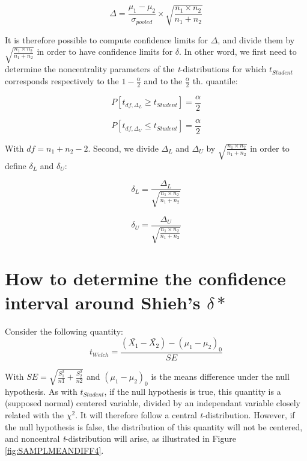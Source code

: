 \documentclass[
  man,floatsintext]{apa6}
\begin{document}
\begin{equation}
\Delta = \frac{\mu_1-\mu_2}{\sigma_{pooled}} \times \sqrt{\frac{n_1 \times n_2}{n_1 + n_2}}
\label{eq:ncp}
\end{equation}

It is therefore possible to compute confidence limits for \(\Delta\), and divide them by \(\sqrt{\frac{n_1 \times n_2}{n_1 + n_2}}\) in order to have confidence limits for \(\delta\). In other word, we first need to determine the noncentrality parameters of the \emph{t}-distributions for which \(t_{Student}\) corresponds respectively to the \(1-\frac{\alpha}{2}\) and to the \(\frac{\alpha}{2}\) th. quantile:

\[P[t_{df, \Delta_L} \geq t_{Student}] = \frac{\alpha}{2} \]

\[P[t_{df, \Delta_U} \leq t_{Student}] = \frac{\alpha}{2} \]

With \(df = n_1+n_2-2\). Second, we divide \(\Delta_L\) and \(\Delta_U\) by \(\sqrt{\frac{n_1 \times n_2}{n_1 + n_2}}\) in order to define \(\delta_L\) and \(\delta_U\):

\[\delta_L = \frac{\Delta_L}{\sqrt{\frac{n_1 \times n_2}{n_1 + n_2}}}\]

\[\delta_U = \frac{\Delta_U}{\sqrt{\frac{n_1 \times n_2}{n_1 + n_2}}}\]

\hypertarget{how-to-determine-the-confidence-interval-around-shiehs-delta}{%
\section{\texorpdfstring{How to determine the confidence interval around Shieh's \(\delta*\)}{How to determine the confidence interval around Shieh's \textbackslash delta*}}\label{how-to-determine-the-confidence-interval-around-shiehs-delta}}

Consider the following quantity:
\begin{equation} 
t_{Welch}=\frac{(\bar{X_1}-\bar{X_2})-(\mu_1-\mu_2)_0}{SE}
\label{eq:plausiblelimit2}
\end{equation}

With \(SE = \sqrt{\frac{S^2_1}{n1}+\frac{S^2_2}{n2}}\) and \((\mu_1-\mu_2)_0\) is the means difference under the null hypothesis. As with \(t_{Student}\), if the null hypothesis is true, this quantity is a (supposed normal) centered variable, divided by an independant variable closely related with the \(\chi^2\). It will therefore follow a central \emph{t}-distribution. However, if the null hypothesis is false, the distribution of this quantity will not be centered, and noncentral \emph{t}-distribution will arise, as illustrated in Figure \ref{fig:SAMPLMEANDIFF4}.
\end{document}
